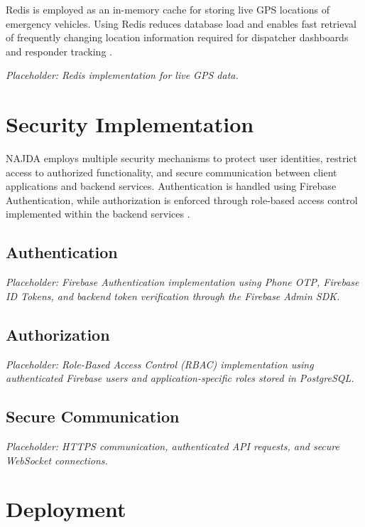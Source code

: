 Redis is employed as an in-memory cache for storing live GPS locations of emergency vehicles. Using Redis reduces database load and enables fast retrieval of frequently changing location information required for dispatcher dashboards and responder tracking \cite{redis}.

\textit{Placeholder: Redis implementation for live GPS data.}


\section{Security Implementation}

NAJDA employs multiple security mechanisms to protect user identities, restrict access to authorized functionality, and secure communication between client applications and backend services. Authentication is handled using Firebase Authentication, while authorization is enforced through role-based access control implemented within the backend services \cite{firebase}.

\subsection{Authentication}

\textit{Placeholder: Firebase Authentication implementation using Phone OTP, Firebase ID Tokens, and backend token verification through the Firebase Admin SDK.}

\subsection{Authorization}

\textit{Placeholder: Role-Based Access Control (RBAC) implementation using authenticated Firebase users and application-specific roles stored in PostgreSQL.}

\subsection{Secure Communication}

\textit{Placeholder: HTTPS communication, authenticated API requests, and secure WebSocket connections.}


\section{Deployment}

